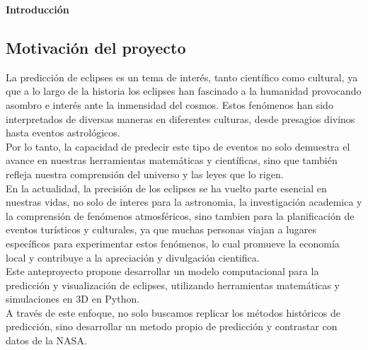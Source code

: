 \setcounter{section}{1}
\begin{singlespace}

    \huge{\textbf{Introducción}} 

    \normalsize

    \subsection{Motivación del proyecto}
    La predicción de eclipses es un tema de interés, tanto científico como cultural, ya que a lo largo de la historia los eclipses han
    fascinado a la humanidad provocando asombro e interés ante la inmensidad del cosmos. Estos fenómenos han sido interpretados de diversas
    maneras en diferentes culturas, desde presagios divinos hasta eventos astrológicos. \\
    Por lo tanto, la capacidad de predecir este tipo de eventos no solo demuestra el avance en nuestras herramientas matemáticas y
    científicas, sino que también refleja nuestra comprensión del universo y las leyes que lo rigen.\\
    En la actualidad, la precisión de los eclipses se ha vuelto parte esencial en nuestras vidas, no solo de interes para la astronomia,
    la investigación academica y la comprensión de fenómenos atmosféricos, sino tambien para la planificación de eventos turísticos y
    culturales, ya que muchas personas viajan a lugares específicos para experimentar estos fenómenos, lo cual promueve la economía local y contribuye
    a la apreciación y divulgación cientifica.\\ 
    Este anteproyecto propone desarrollar un modelo computacional para la predicción y visualización de eclipses, utilizando herramientas
    matemáticas y simulaciones en 3D en Python.\\ A través de este enfoque, no solo buscamos replicar los métodos históricos de predicción,
    sino desarrollar un metodo propio de predicción y contrastar con datos de la NASA. 
    
\end{singlespace}